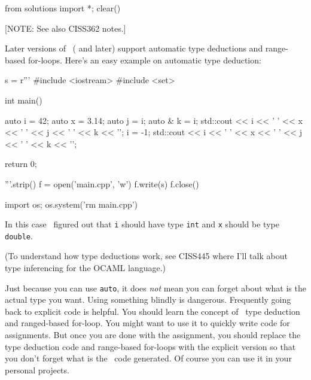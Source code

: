 
\begin{python0}
from solutions import *; clear()
\end{python0}

[NOTE: See also CISS362 notes.]

Later versions of \gpp\ ( and later) support automatic type deductions and
range-based for-loops.
Here's an easy example on automatic type deduction: 
\begin{python}
s = r'''
#include <iostream>
#include <set>

int main()
{
    auto i = 42;
    auto x = 3.14;
    auto j = i;
    auto & k = i;
    std::cout << i << ' ' << x << ' ' << j << ' ' << k << '\n';
    i = -1;
    std::cout << i << ' ' << x << ' ' << j << ' ' << k << '\n';
    
    return 0;
}
'''.strip()
f = open('main.cpp', 'w')
f.write(s)
f.close()
\end{python}
\begin{python}
import os; os.system('rm main.cpp')
\end{python}
In this case \gpp\
figured out that \verb!i! should have type \verb!int!
and \verb!x! should be type \verb!double!.

(To understand how type deductions work, see CISS445 where I'll talk
about type inferencing for the OCAML language.)

Just because you can use \verb!auto!, it does \textit{not} mean
you can forget about what is the actual type you want.
Using something blindly is dangerous.
Frequently going back to explicit code is helpful.
You should learn the concept of \cpp\ type deduction and
ranged-based for-loop.
You might want to use it to quickly write code for assignments.
But once you are done with the assignment, you should
replace the type deduction code and range-based for-loops
with the explicit version so that you don't forget what
is the \cpp\ code generated.
Of course you can use it in your personal projects.
